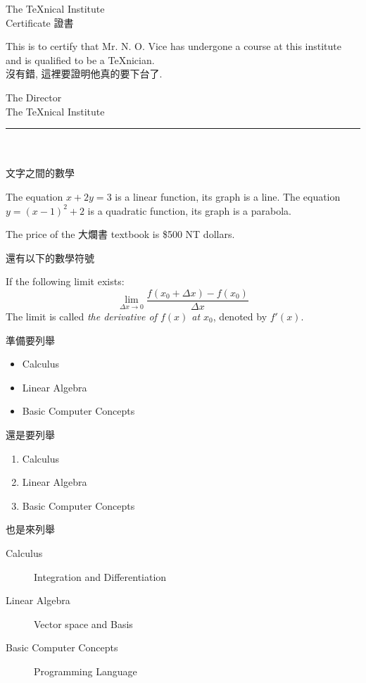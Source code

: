\documentclass[twocolumn]{article}
\begin{document}
\begin{center}
The \TeX nical Institute\\[.75cm]
Certificate 證書
\end{center}
\noindent This is to certify that Mr. N. O. Vice has undergone a
course at this institute and is qualified to be a \TeX nician.\\[.75cm]
\noindent 沒有錯, 這裡要證明他真的要下台了.

\begin{flushright}
The Director\\
The \TeX nical Institute
\end{flushright}

\rule{80mm}{.2pt}
\\[2cm]
\\[2cm]

文字之間的數學

The equation $x + 2y = 3$ is a linear function,
its graph is a line.
The equation $y = (x-1)^2 + 2$ is a quadratic function,
its graph is a parabola.

The price of the 大爛書 textbook is \$500 NT dollars.

還有以下的數學符號

If the following limit exists:
$$
\lim_{\Delta x\to 0} \frac{f(x_0+\Delta x) - f(x_0)}{\Delta x}
$$
The limit is called {\it the derivative of $f(x)$ at $x_0$},
denoted by $f'(x)$.

準備要列舉

\begin{itemize}
\item Calculus
\item Linear Algebra
\item Basic Computer Concepts
\end{itemize}

還是要列舉

\begin{enumerate}
\item Calculus
\item Linear Algebra
\item Basic Computer Concepts
\end{enumerate}

也是來列舉

\begin{description}
\item [Calculus] Integration and Differentiation
\item [Linear Algebra] Vector space and Basis
\item [Basic Computer Concepts] Programming Language
\end{description}
\end{document}
